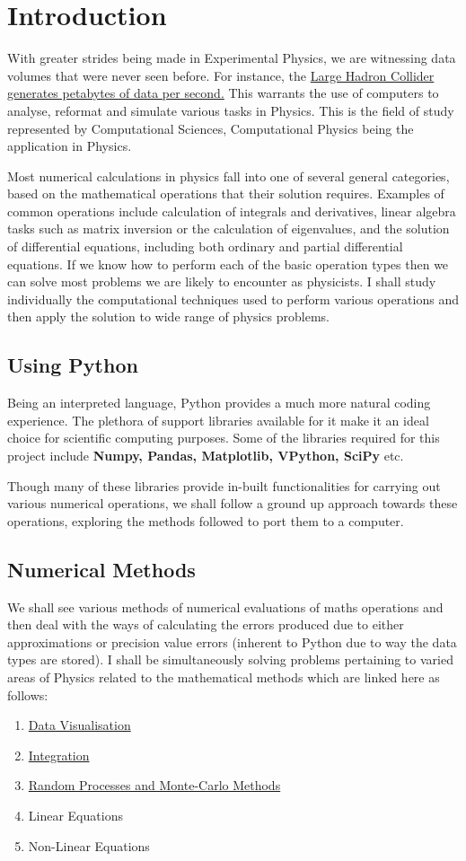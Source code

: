 \section{Introduction}
	\par With greater strides being made in Experimental Physics, we are witnessing data volumes that were never seen before. For instance, the \href{https://home.cern/news/news/computing/cern-data-centre-passes-200-petabyte-milestone}{Large Hadron Collider generates petabytes of data per second.} This warrants the use of computers to analyse, reformat and simulate various tasks in Physics. This is the field of study represented by Computational Sciences, Computational Physics being the application in Physics.\medskip
	\par Most numerical calculations in physics fall into one of several general categories, based on the mathematical operations that their solution requires. Examples of common operations include calculation of integrals and derivatives, linear algebra tasks such as matrix inversion or the calculation of eigenvalues, and the solution of differential equations, including both ordinary and partial differential equations. 
     If we know how to perform each of the basic operation types then we can solve most problems we are likely to encounter as physicists. I shall study individually the computational techniques used to perform various operations and then apply the solution to wide range of physics problems.
\subsection{Using Python}
Being an interpreted language, Python provides a much more natural coding experience. The plethora of support libraries available for it make it an ideal choice for scientific computing purposes. Some of the libraries required for this project include \textbf{Numpy, Pandas, Matplotlib, VPython, SciPy} etc. 
	\par Though many of these libraries provide in-built functionalities for carrying out various numerical operations, we shall follow a ground up approach towards these operations, exploring the methods followed to port them to a computer.
\subsection{Numerical Methods}
We shall see various methods of numerical evaluations of maths operations and then deal with the ways of calculating the errors produced due to either approximations or precision value errors (inherent to Python due to way the data types are stored). I shall be simultaneously solving problems pertaining to varied areas of Physics related to the mathematical methods which are linked here as follows:
 
\begin{enumerate}
	\item \hyperlink{section.2}{Data Visualisation}
	\item \hyperlink{section.3}{Integration}
	\item \hyperlink{section.4}{Random Processes and Monte-Carlo Methods}
	\item Linear Equations
	\item Non-Linear Equations
\end{enumerate}